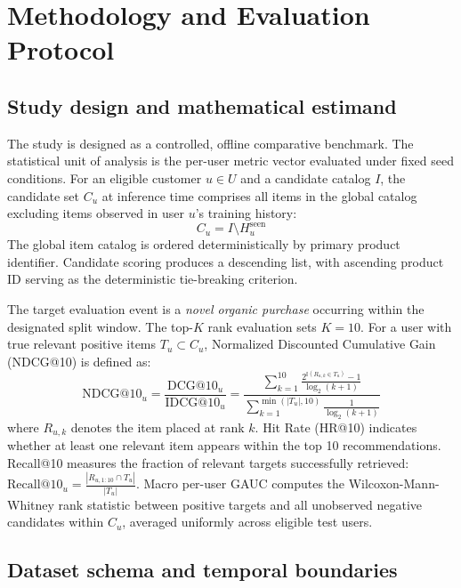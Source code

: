 \documentclass[10pt,a4paper]{article}
\begin{document}
\section{Methodology and Evaluation Protocol}

\subsection{Study design and mathematical estimand}

The study is designed as a controlled, offline comparative benchmark. The statistical unit of analysis is the per-user metric vector evaluated under fixed seed conditions. For an eligible customer $u \in U$ and a candidate catalog $I$, the candidate set $C_u$ at inference time comprises all items in the global catalog excluding items observed in user $u$'s training history:
\begin{equation}
    C_u = I \setminus H_u^{\mathrm{seen}}
\end{equation}
The global item catalog is ordered deterministically by primary product identifier. Candidate scoring produces a descending list, with ascending product ID serving as the deterministic tie-breaking criterion.

The target evaluation event is a \textit{novel organic purchase} occurring within the designated split window. The top-$K$ rank evaluation sets $K=10$. For a user with true relevant positive items $T_u \subset C_u$, Normalized Discounted Cumulative Gain (NDCG@10) is defined as:
\begin{equation}
    \mathrm{NDCG@10}_u = \frac{\mathrm{DCG@10}_u}{\mathrm{IDCG@10}_u} = \frac{\sum_{k=1}^{10} \frac{2^{\mathbb{I}(R_{u,k} \in T_u)} - 1}{\log_2(k + 1)}}{\sum_{k=1}^{\min(|T_u|, 10)} \frac{1}{\log_2(k + 1)}}
\end{equation}
where $R_{u,k}$ denotes the item placed at rank $k$. Hit Rate (HR@10) indicates whether at least one relevant item appears within the top 10 recommendations. Recall@10 measures the fraction of relevant targets successfully retrieved: $\mathrm{Recall@10}_u = \frac{|R_{u, 1:10} \cap T_u|}{|T_u|}$. Macro per-user GAUC computes the Wilcoxon-Mann-Whitney rank statistic between positive targets and all unobserved negative candidates within $C_u$, averaged uniformly across eligible test users.

\subsection{Dataset schema and temporal boundaries}
\end{document}
